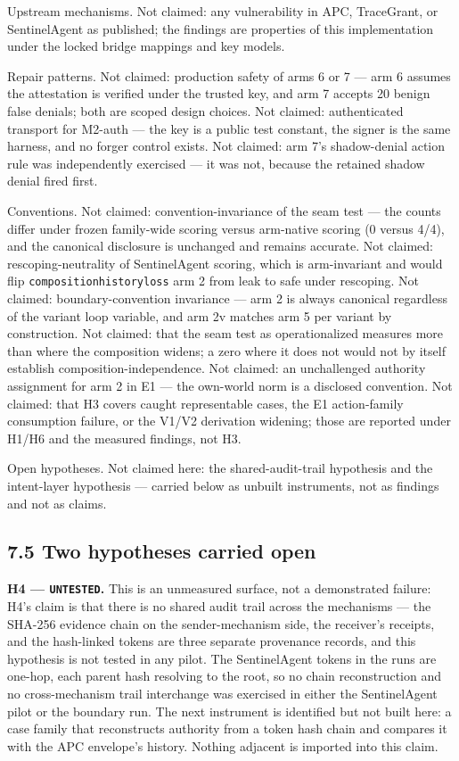\documentclass[
  10pt,
]{article}
\let\origtexttt\texttt
\renewcommand{\texttt}[1]{{\upshape\origtexttt{#1}}}
\renewcommand{\_}{\origunderscore\allowbreak}
\begin{document}
Upstream mechanisms. Not claimed: any vulnerability in APC, TraceGrant,
or SentinelAgent as published; the findings are properties of this
implementation under the locked bridge mappings and key models.

Repair patterns. Not claimed: production safety of arms 6 or 7 --- arm 6
assumes the attestation is verified under the trusted key, and arm 7
accepts 20 benign false denials; both are scoped design choices. Not
claimed: authenticated transport for M2-auth --- the key is a public
test constant, the signer is the same harness, and no forger control
exists. Not claimed: arm 7's shadow-denial action rule was independently
exercised --- it was not, because the retained shadow denial fired
first.

Conventions. Not claimed: convention-invariance of the seam test --- the
counts differ under frozen family-wide scoring versus arm-native scoring
(0 versus 4/4), and the canonical disclosure is unchanged and remains
accurate. Not claimed: rescoping-neutrality of SentinelAgent scoring,
which is arm-invariant and would flip
\texttt{composition\_history\_loss} arm 2 from leak to safe under
rescoping. Not claimed: boundary-convention invariance --- arm 2 is
always canonical regardless of the variant loop variable, and arm 2v
matches arm 5 per variant by construction. Not claimed: that the seam
test as operationalized measures more than where the composition widens;
a zero where it does not would not by itself establish
composition-independence. Not claimed: an unchallenged authority
assignment for arm 2 in E1 --- the own-world norm is a disclosed
convention. Not claimed: that H3 covers caught representable cases, the
E1 action-family consumption failure, or the V1/V2 derivation widening;
those are reported under H1/H6 and the measured findings, not H3.

Open hypotheses. Not claimed here: the shared-audit-trail hypothesis and
the intent-layer hypothesis --- carried below as unbuilt instruments,
not as findings and not as claims.

\subsection{7.5 Two hypotheses carried
open}\label{two-hypotheses-carried-open}

\textbf{H4 --- \texttt{UNTESTED}.} This is an unmeasured surface, not a
demonstrated failure: H4's claim is that there is no shared audit trail
across the mechanisms --- the SHA-256 evidence chain on the
sender-mechanism side, the receiver's receipts, and the hash-linked
tokens are three separate provenance records, and this hypothesis is not
tested in any pilot. The SentinelAgent tokens in the runs are one-hop,
each parent hash resolving to the root, so no chain reconstruction and
no cross-mechanism trail interchange was exercised in either the
SentinelAgent pilot or the boundary run. The next instrument is
identified but not built here: a case family that reconstructs authority
from a token hash chain and compares it with the APC envelope's history.
Nothing adjacent is imported into this claim.
\end{document}
